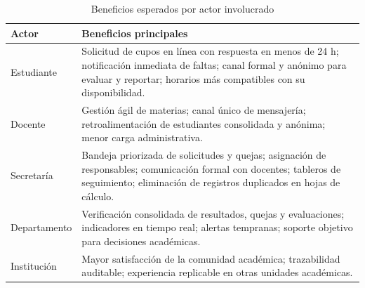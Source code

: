 \begin{table}[H]
\centering
\caption{Beneficios esperados por actor involucrado}
\label{tab:beneficios}
\small
\begin{tabularx}{\textwidth}{@{}l X@{}}
\toprule
\rowcolor{verdeClaro}
\textbf{Actor} & \textbf{Beneficios principales} \\
\midrule
Estudiante &
  Solicitud de cupos en línea con respuesta en menos de 24 h; notificación
  inmediata de faltas; canal formal y anónimo para evaluar y reportar; horarios
  más compatibles con su disponibilidad. \\
Docente &
  Gestión ágil de materias; canal único de mensajería; retroalimentación de
  estudiantes consolidada y anónima; menor carga administrativa. \\
Secretaría &
  Bandeja priorizada de solicitudes y quejas; asignación de responsables;
  comunicación formal con docentes; tableros de seguimiento; eliminación de
  registros duplicados en hojas de cálculo. \\
Departamento &
  Verificación consolidada de resultados, quejas y evaluaciones; indicadores en
  tiempo real; alertas tempranas; soporte objetivo para decisiones académicas. \\
Institución &
  Mayor satisfacción de la comunidad académica; trazabilidad auditable;
  experiencia replicable en otras unidades académicas. \\
\bottomrule
\end{tabularx}
\end{table}